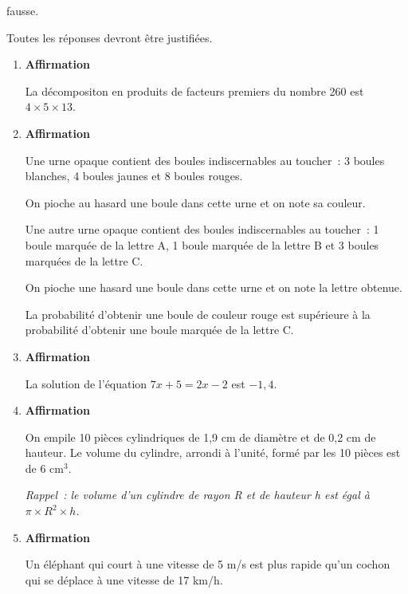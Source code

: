 \documentclass{dnbqcm}
\begin{document}
fausse.\par\bigskip\noindent Toutes les réponses devront être
justifiées.
\begin{enumerate}
    \item {\bfseries Affirmation }\par La décompositon en
    produits de facteurs premiers du nombre 260 est $4\times5\times13$.
    \item {\bfseries Affirmation }\par Une urne opaque contient des boules
    indiscernables au toucher~: 3 boules blanches, 4 boules jaunes et 8 boules rouges.
    \par\noindent On pioche au hasard une boule dans cette urne et on note sa couleur.
    \par\medskip\noindent Une autre urne opaque contient des boules indiscernables au
    toucher~: 1 boule marquée de la lettre A, 1 boule marquée de la lettre B et 3
    boules marquées de la lettre C.\par\noindent
    On pioche une hasard une boule dans cette urne et on note la lettre obtenue.

    \par\medskip\noindent La probabilité d'obtenir une boule de couleur rouge est
    supérieure à la probabilité d'obtenir une boule marquée de la lettre C.
    \item {\bfseries Affirmation }\par La solution de l'équation
    $7x+5=2x-2$ est $-1,4$.
    \item {\bfseries Affirmation }\par On empile 10 pièces cylindriques
    de 1,9 cm de diamètre et de 0,2 cm de hauteur. Le volume du cylindre, arrondi à
    l'unité, formé par les 10 pièces est de 6 cm$^3$.\par\medskip\noindent
    {\itshape Rappel~: le volume d'un cylindre de rayon R et de hauteur h est égal à
    $\pi\times R^2\times h$.}
    \item {\bfseries Affirmation }\par Un éléphant qui court à une
    vitesse de 5 m/s est plus rapide qu'un cochon qui se déplace à une vitesse de 17 km/h.
\end{enumerate}
\end{document}
